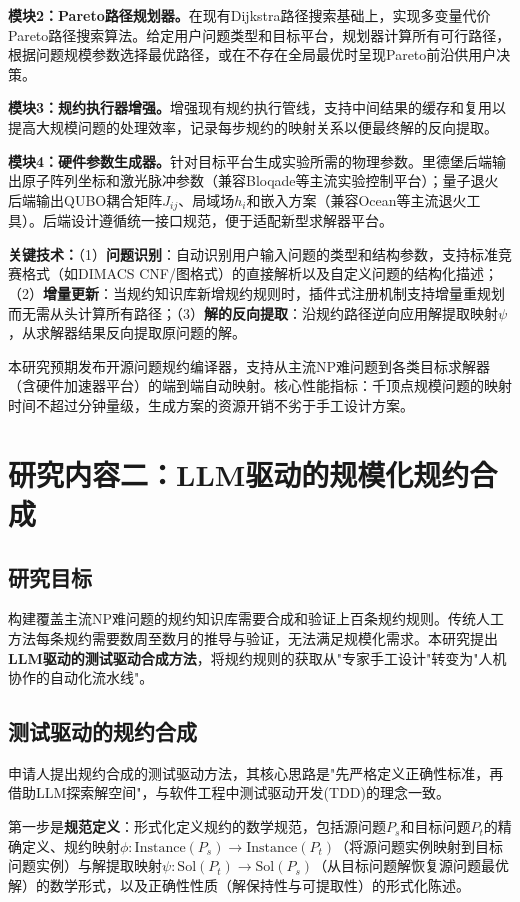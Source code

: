 \textbf{模块2：Pareto路径规划器。}在现有Dijkstra路径搜索基础上，实现多变量代价Pareto路径搜索算法。给定用户问题类型和目标平台，规划器计算所有可行路径，根据问题规模参数选择最优路径，或在不存在全局最优时呈现Pareto前沿供用户决策。

\textbf{模块3：规约执行器增强。}增强现有规约执行管线，支持中间结果的缓存和复用以提高大规模问题的处理效率，记录每步规约的映射关系以便最终解的反向提取。

\textbf{模块4：硬件参数生成器。}针对目标平台生成实验所需的物理参数。里德堡后端输出原子阵列坐标和激光脉冲参数（兼容Bloqade等主流实验控制平台）；量子退火后端输出QUBO耦合矩阵$J_{ij}$、局域场$h_i$和嵌入方案（兼容Ocean等主流退火工具）。后端设计遵循统一接口规范，便于适配新型求解器平台。

\textbf{关键技术：}（1）\textbf{问题识别}：自动识别用户输入问题的类型和结构参数，支持标准竞赛格式（如DIMACS CNF/图格式）的直接解析以及自定义问题的结构化描述；（2）\textbf{增量更新}：当规约知识库新增规约规则时，插件式注册机制支持增量重规划而无需从头计算所有路径；（3）\textbf{解的反向提取}：沿规约路径逆向应用解提取映射$\psi$，从求解器结果反向提取原问题的解。

本研究预期发布开源问题规约编译器，支持从主流NP难问题到各类目标求解器（含硬件加速器平台）的端到端自动映射。核心性能指标：千顶点规模问题的映射时间不超过分钟量级，生成方案的资源开销不劣于手工设计方案。


\section{研究内容二：LLM驱动的规模化规约合成}

\subsection{研究目标}

构建覆盖主流NP难问题的规约知识库需要合成和验证上百条规约规则。传统人工方法每条规约需要数周至数月的推导与验证，无法满足规模化需求。本研究提出\textbf{LLM驱动的测试驱动合成方法}，将规约规则的获取从"专家手工设计"转变为"人机协作的自动化流水线"。

\subsection{测试驱动的规约合成}

申请人提出规约合成的测试驱动方法，其核心思路是"先严格定义正确性标准，再借助LLM探索解空间"，与软件工程中测试驱动开发(TDD)的理念一致。

第一步是\textbf{规范定义}：形式化定义规约的数学规范，包括源问题$P_s$和目标问题$P_t$的精确定义、规约映射$\phi: \text{Instance}(P_s) \to \text{Instance}(P_t)$（将源问题实例映射到目标问题实例）与解提取映射$\psi: \text{Sol}(P_t) \to \text{Sol}(P_s)$（从目标问题解恢复源问题最优解）的数学形式，以及正确性性质（解保持性与可提取性）的形式化陈述。

